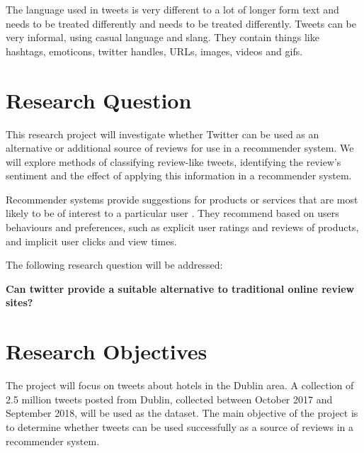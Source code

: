 The language used in tweets is very different to a lot of longer form text and needs to be treated differently and needs to be treated differently. Tweets can be very informal, using casual language and slang. They contain things like hashtags, emoticons, twitter handles, URLs, images, videos and gifs.

\section{Research Question}
This research project will investigate whether Twitter can be used as an alternative or additional source of reviews for use in a recommender system. We will explore methods of classifying review-like tweets, identifying the review's sentiment and the effect of applying this information in a recommender system.

Recommender systems provide suggestions for products or services that are most likely to be of interest to a particular user \cite{Ricci2015}. They recommend based on users behaviours and preferences, such as explicit user ratings and reviews of products, and implicit user clicks and view times.

The following research question will be addressed:
\begin{center}
\textbf{Can twitter provide a suitable alternative to traditional online review sites?}
\end{center}

\section{Research Objectives}
The project will focus on tweets about hotels in the Dublin area. A collection of 2.5 million tweets posted from Dublin, collected between October 2017 and September 2018, will be used as the dataset. The main objective of the project is to determine whether tweets can be used successfully as a source of reviews in a recommender system.

